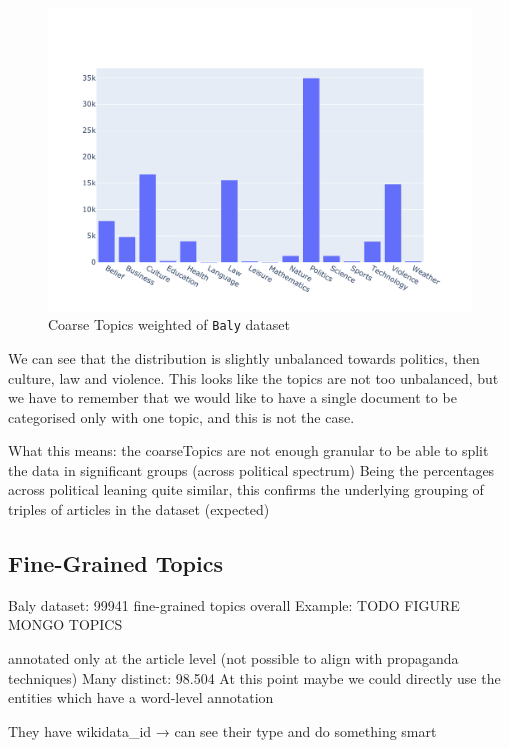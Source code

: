 \begin{figure}[!htbp]
    \centering
    \includegraphics[width=\linewidth]{figures/baly_coarse_weighted.pdf}
    \caption{Coarse Topics weighted of \texttt{Baly} dataset}
    \label{fig:baly_coarse_weighted}
\end{figure}

We can see that the distribution is slightly unbalanced towards politics, then culture, law and violence. This looks like the topics are not too unbalanced, but we have to remember that we would like to have a single document to be categorised only with one topic, and this is not the case.


What this means:
the coarseTopics are not enough granular to be able to split the data in significant groups (across political spectrum)
Being the percentages across political leaning quite similar, this confirms the underlying grouping of triples of articles in the dataset (expected)


\subsection{Fine-Grained Topics}

Baly dataset: 99941 fine-grained topics overall
Example:
TODO FIGURE MONGO TOPICS

annotated only at the article level (not possible to align with propaganda techniques)
Many distinct: 98.504
At this point maybe we could directly use the entities which have a word-level annotation 

They have wikidata\_id → can see their type and do something smart


